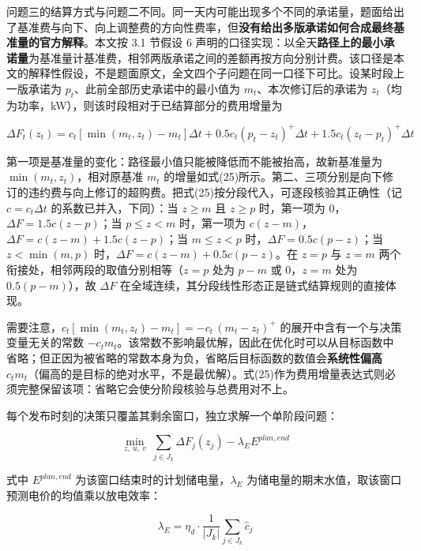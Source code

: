 \documentclass[12pt,a4paper]{ctexart}
\begin{document}
问题三的结算方式与问题二不同。同一天内可能出现多个不同的承诺量，题面给出了基准费与向下、向上调整费的方向性费率，但\textbf{没有给出多版承诺如何合成最终基准量的官方解释}。本文按 3.1 节假设 6 声明的口径实现：以全天\textbf{路径上的最小承诺量}为基准量计基准费，相邻两版承诺之间的差额再按方向分别计费。该口径是本文的解释性假设，不是题面原文，全文四个子问题在同一口径下可比。设某时段上一版承诺为 $p_t$、此前全部历史承诺中的最小值为 $m_t$、本次修订后的承诺为 $z_t$（均为功率，kW），则该时段相对于已结算部分的费用增量为

\begin{equation}
\Delta F_t(z_t)=c_t\left[\min(m_t,z_t)-m_t\right]\Delta t+0.5c_t\left(p_t-z_t\right)^{+}\Delta t+1.5c_t\left(z_t-p_t\right)^{+}\Delta t
\end{equation}

第一项是基准量的变化：路径最小值只能被降低而不能被抬高，故新基准量为 $\min(m_t,z_t)$，相对原基准 $m_t$ 的增量如式(25)所示。第二、三项分别是向下修订的违约费与向上修订的超购费。把式(25)按分段代入，可逐段核验其正确性（记 $c=c_t\Delta t$ 的系数已并入，下同）：当 $z\ge m$ 且 $z\ge p$ 时，第一项为 0，$\Delta F=1.5c(z-p)$；当 $p\le z<m$ 时，第一项为 $c(z-m)$，$\Delta F=c(z-m)+1.5c(z-p)$；当 $m\le z<p$ 时，$\Delta F=0.5c(p-z)$；当 $z<\min(m,p)$ 时，$\Delta F=c(z-m)+0.5c(p-z)$。在 $z=p$ 与 $z=m$ 两个衔接处，相邻两段的取值分别相等（$z=p$ 处为 $p-m$ 或 0，$z=m$ 处为 $0.5(p-m)$），故 $\Delta F$ 在全域连续，其分段线性形态正是链式结算规则的直接体现。

需要注意，$c_t[\min(m_t,z_t)-m_t]=-c_t\,(m_t-z_t)^{+}$ 的展开中含有一个与决策变量无关的常数 $-c_t m_t$。该常数不影响最优解，因此在优化时可以从目标函数中省略；但正因为被省略的常数本身为负，省略后目标函数的数值会\textbf{系统性偏高} $c_t m_t$（偏高的是目标的绝对水平，不是最优解）。式(25)作为费用增量表达式则必须完整保留该项：省略它会使分阶段核验与总费用对不上。

每个发布时刻的决策只覆盖其剩余窗口，独立求解一个单阶段问题：

\begin{equation}
\min_{z,\ u,\ v}\ \sum_{j\in J_k}\Delta F_j(z_j)-\lambda_E E^{plan,end}
\end{equation}

式中 $E^{plan,end}$ 为该窗口结束时的计划储电量，$\lambda_E$ 为储电量的期末水值，取该窗口预测电价的均值乘以放电效率：

\begin{equation}
\lambda_E=\eta_d\cdot\frac{1}{|J_k|}\sum_{j\in J_k}\hat{c}_j
\end{equation}
\end{document}
